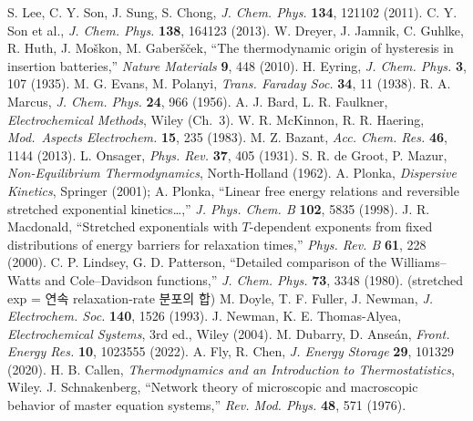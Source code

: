  S. Lee, C. Y. Son, J. Sung, S. Chong, \emph{J. Chem. Phys.} \textbf{134}, 121102 (2011).
 C. Y. Son et al., \emph{J. Chem. Phys.} \textbf{138}, 164123 (2013).
 W. Dreyer, J. Jamnik, C. Guhlke, R. Huth, J. Mo\v{s}kon, M. Gaber\v{s}\v{c}ek, ``The thermodynamic origin of hysteresis in insertion batteries,'' \emph{Nature Materials} \textbf{9}, 448 (2010).
 H. Eyring, \emph{J. Chem. Phys.} \textbf{3}, 107 (1935).
 M. G. Evans, M. Polanyi, \emph{Trans. Faraday Soc.} \textbf{34}, 11 (1938).
 R. A. Marcus, \emph{J. Chem. Phys.} \textbf{24}, 966 (1956).
 A. J. Bard, L. R. Faulkner, \emph{Electrochemical Methods}, Wiley (Ch.~3).
 W. R. McKinnon, R. R. Haering, \emph{Mod.\ Aspects Electrochem.} \textbf{15}, 235 (1983).
 M. Z. Bazant, \emph{Acc. Chem. Res.} \textbf{46}, 1144 (2013).
 L. Onsager, \emph{Phys. Rev.} \textbf{37}, 405 (1931).
 S. R. de Groot, P. Mazur, \emph{Non-Equilibrium Thermodynamics}, North-Holland (1962).
 A. Plonka, \emph{Dispersive Kinetics}, Springer (2001); A. Plonka, ``Linear free energy relations and reversible stretched exponential kinetics…,'' \emph{J. Phys. Chem. B} \textbf{102}, 5835 (1998).
 J. R. Macdonald, ``Stretched exponentials with $T$-dependent exponents from fixed distributions of energy barriers for relaxation times,'' \emph{Phys. Rev. B} \textbf{61}, 228 (2000).
 C. P. Lindsey, G. D. Patterson, ``Detailed comparison of the Williams--Watts and Cole--Davidson functions,'' \emph{J. Chem. Phys.} \textbf{73}, 3348 (1980). (stretched exp = 연속 relaxation-rate 분포의 합)
 M. Doyle, T. F. Fuller, J. Newman, \emph{J. Electrochem. Soc.} \textbf{140}, 1526 (1993).
 J. Newman, K. E. Thomas-Alyea, \emph{Electrochemical Systems}, 3rd ed., Wiley (2004).
 M. Dubarry, D. Anse\'an, \emph{Front. Energy Res.} \textbf{10}, 1023555 (2022).
 A. Fly, R. Chen, \emph{J. Energy Storage} \textbf{29}, 101329 (2020).
 H. B. Callen, \emph{Thermodynamics and an Introduction to Thermostatistics}, Wiley.
 J. Schnakenberg, ``Network theory of microscopic and macroscopic behavior of master equation systems,'' \emph{Rev. Mod. Phys.} \textbf{48}, 571 (1976).
